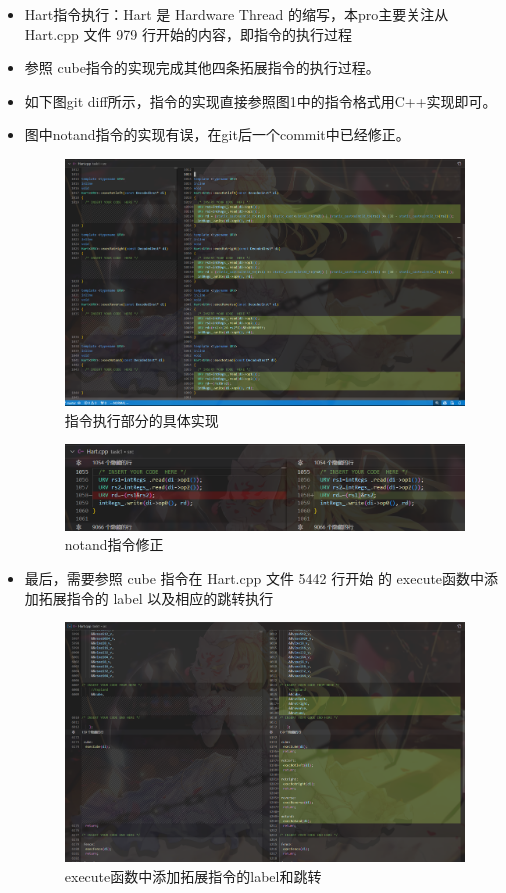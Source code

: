 \documentclass[12pt,hyperref,a4paper,UTF8]{ctexart}
\begin{document}
\begin{itemize}
    \item Hart指令执行：Hart 是 Hardware Thread 的缩写，本pro主要关注从 Hart.cpp 文件 979 
行开始的内容，即指令的执行过程
    \item 参照 cube指令的实现完成其他四条拓展指令的执行过程。
    \item 如下图git diff所示，指令的实现直接参照图1中的指令格式用C++实现即可。
    \item 图中notand指令的实现有误，在git后一个commit中已经修正。
  \begin{figure}[H]
      \centering
      \includegraphics[width =1.0\textwidth]{figures/fig/image5.png}
      \caption{指令执行部分的具体实现}
  \end{figure}

  \begin{figure}[H]
      \centering
      \includegraphics[width =1.0\textwidth]{figures/fig/image6.png}
      \caption{notand指令修正}
  \end{figure}


    \item 最后，需要参照 cube 指令在 Hart.cpp 文件 5442 行开始
的 execute函数中添加拓展指令的 label 以及相应的跳转执行
  \begin{figure}[H]
      \centering
      \includegraphics[width =1.0\textwidth]{figures/fig/image7.png}
      \caption{execute函数中添加拓展指令的label和跳转}
  \end{figure}


\end{itemize}
\end{document}
